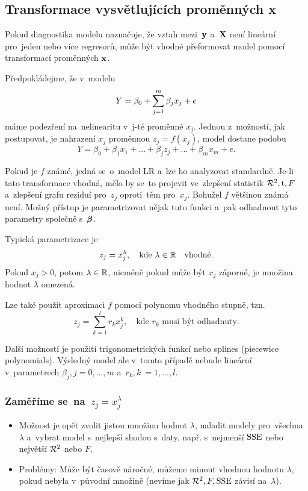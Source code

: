\subsection{Transformace vysvětlujících proměnných x}

Pokud diagnostika modelu naznačuje, že vztah mezi~$\mathbf{y}$ a~$\mathbf{X}$ není lineární pro~jeden nebo více regresorů, může být vhodné přeformovat model pomocí transformací proměnných $\mathbf{x}$.

Předpokládejme, že v~modelu $$Y = \beta_0 + \sum_{j=1}^{m} \beta_j x_j + e$$ máme podezření na~nelinearitu v~j-té proměnné $x_j$. Jednou z~možností, jak postupovat, je nahrazení $x_j$ proměnnou $z_j = f(x_j)$, model dostane podobu $$Y = \beta_0 + \beta_1 x_1 +... + \beta_j z_j +... + \beta_m x_m + e.$$

Pokud je $f$ známé, jedná se~o~model LR a~lze ho analyzovat standardně. Je-li tato transformace vhodná, mělo by se~to projevit ve~zlepšení statistik $\mathcal{R}^2, \mathrm{t}, F$ a~zlepšení grafu reziduí pro~$z_j$ oproti~těm pro~$x_j$. Bohužel $f$ většinou známá není. Možný přístup je parametrizovat nějak tuto funkci a~pak odhadnout tyto parametry společně s~$\boldsymbol{\beta}$.

Typická parametrizace je
 $$
  z_j = x_j^{\lambda}, \quad \text{kde } \lambda \in \mathbb{R} \quad \text{vhodné}.
 $$
Pokud $x_j > 0$, potom $\lambda \in \mathbb{R}$, nicméně pokud může být $x_j$ záporné, je množina hodnot $\lambda$ omezená.

Lze také použít aproximaci $f$ pomocí polynomu vhodného stupně, tzn.
 $$
  z_j = \sum_{k = 1}^l r_k x_j^k, \quad \text{kde } r_k \text{ musí být odhadnuty.}
 $$
 
Další možností je použití trigonometrických funkcí nebo splines (piecewice polynomials). Výsledný model ale v~tomto případě nebude lineární v~parametrech $\beta_j, j = 0,...,m$ \linebreak a~$ r_k, k~ = 1,...,l $.

\subsubsection{Zaměříme se~na~$z_j = x_j^\lambda$}
\begin{itemize}
	\item Možnost je opět zvolit jistou množinu hodnot $\lambda$, naladit modely pro~všechna $\lambda$ a~vybrat model s~nejlepší shodou s~daty, např. s~nejmenší $\mathrm{SSE}$ nebo největší $\mathcal{R}^2$ nebo $F$.
	\item Problémy: Může být časově náročné, můžeme minout vhodnou hodnotu $\lambda$, pokud nebyla v~původní množině (nevíme jak $\mathcal{R}^2,F,\mathrm{SSE}$ závisí na~$\lambda$).
\end{itemize}

